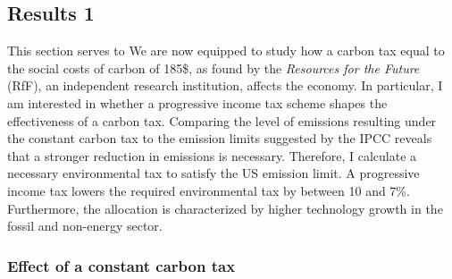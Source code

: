 \subsection{Results 1}\label{subsec:exp}

This section serves to 
We are now equipped to study how a carbon tax  equal to the social costs of carbon of 185\$, as found by the \textit{Resources for the Future} (RfF), an independent research institution, affects the economy. In particular, I am interested in whether a progressive income tax scheme shapes the effectiveness of a carbon tax. 
 Comparing the level of emissions resulting under the constant carbon tax to the emission limits suggested by the IPCC reveals that a stronger reduction in emissions is necessary. Therefore, I calculate a necessary environmental tax to satisfy the US emission limit. A progressive income tax lowers the required environmental tax by between 10 and 7\%. Furthermore, the allocation is characterized by higher technology growth in the fossil and non-energy sector. 


\subsubsection{Effect of a constant carbon tax}


